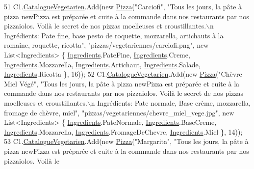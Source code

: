 \begin{DoxyCode}
51             C1.\hyperlink{classModele_1_1Catalogue_abd7d6d70ddd6ba264c1c91a5b084d9ba}{CatalogueVegetarien}.Add(\textcolor{keyword}{new} \hyperlink{classModele_1_1Pizza}{Pizza}(\textcolor{stringliteral}{"Carciofi"}, \textcolor{stringliteral}{"Tous les jours, la
       pâte à pizza newPizza est préparée et cuite à la commande dans nos restaurants par nos pizzaiolos. Voilà le
       secret de nos pizzas moelleuses et croustillantes.\(\backslash\)n Ingrédients: Pate fine, base pesto de roquette,
       mozzarella, artichauts à la romaine, roquette, ricotta"}, \textcolor{stringliteral}{"pizzas/vegetariennes/carciofi.png"}, \textcolor{keyword}{new} List<Ingredients> \{
       \hyperlink{namespaceModele_a001a8e89e56a724f24a249ba98080d41}{Ingredients}.PateFine, \hyperlink{namespaceModele_a001a8e89e56a724f24a249ba98080d41}{Ingredients}.Creme, \hyperlink{namespaceModele_a001a8e89e56a724f24a249ba98080d41}{Ingredients}.Mozzarella, 
      \hyperlink{namespaceModele_a001a8e89e56a724f24a249ba98080d41}{Ingredients}.Artichaut, \hyperlink{namespaceModele_a001a8e89e56a724f24a249ba98080d41}{Ingredients}.Salade, \hyperlink{namespaceModele_a001a8e89e56a724f24a249ba98080d41}{Ingredients}.Ricotta \}, 16));
52             C1.\hyperlink{classModele_1_1Catalogue_abd7d6d70ddd6ba264c1c91a5b084d9ba}{CatalogueVegetarien}.Add(\textcolor{keyword}{new} \hyperlink{classModele_1_1Pizza}{Pizza}(\textcolor{stringliteral}{"Chèvre Miel Végé"}, \textcolor{stringliteral}{"Tous les
       jours, la pâte à pizza newPizza est préparée et cuite à la commande dans nos restaurants par nos pizzaiolos.
       Voilà le secret de nos pizzas moelleuses et croustillantes.\(\backslash\)n Ingrédients: Pate normale, Base crème,
       mozzarella, fromage de chèvre, miel"}, \textcolor{stringliteral}{"pizzas/vegetariennes/chevre\_miel\_vege.jpg"}, \textcolor{keyword}{new} List<Ingredients> \{ 
      \hyperlink{namespaceModele_a001a8e89e56a724f24a249ba98080d41}{Ingredients}.PateNormale, \hyperlink{namespaceModele_a001a8e89e56a724f24a249ba98080d41}{Ingredients}.BaseCreme, 
      \hyperlink{namespaceModele_a001a8e89e56a724f24a249ba98080d41}{Ingredients}.Mozzarella, \hyperlink{namespaceModele_a001a8e89e56a724f24a249ba98080d41}{Ingredients}.FromageDeChevre, 
      \hyperlink{namespaceModele_a001a8e89e56a724f24a249ba98080d41}{Ingredients}.Miel \}, 14));
53             C1.\hyperlink{classModele_1_1Catalogue_abd7d6d70ddd6ba264c1c91a5b084d9ba}{CatalogueVegetarien}.Add(\textcolor{keyword}{new} \hyperlink{classModele_1_1Pizza}{Pizza}(\textcolor{stringliteral}{"Margarita"}, \textcolor{stringliteral}{"Tous les jours, la
       pâte à pizza newPizza est préparée et cuite à la commande dans nos restaurants par nos pizzaiolos. Voilà le
}
\end{DoxyCode}
